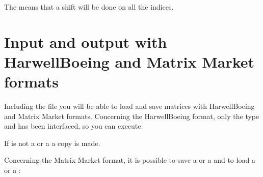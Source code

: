 \documentclass[a4paper,11pt,english]{sphinxmanual}
\begin{document}
\sphinxAtStartPar
The  means that a shift will be done on all the indices.


\chapter{Input and output with Harwell\sphinxhyphen{}Boeing and Matrix Market formats}
\label{\detokenize{gmm/export:input-and-output-with-harwell-boeing-and-matrix-market-formats}}\label{\detokenize{gmm/export:gmm-export}}\label{\detokenize{gmm/export::doc}}
\sphinxAtStartPar
Including the file  you will be able to load and save matrices with Harwell\sphinxhyphen{}Boeing and Matrix Market formats. Concerning the Harwell\sphinxhyphen{}Boeing format, only the type  and  has been interfaced, so you can execute:

\begin{sphinxVerbatim}[commandchars=\\\{\}]
  
  
\end{sphinxVerbatim}

\sphinxAtStartPar
If  is not a   or a  a copy is made.

\sphinxAtStartPar
Concerning the Matrix Market format, it is possible to save a  or a   and to load a  or a :

\begin{sphinxVerbatim}[commandchars=\\\{\}]
  
  
\end{sphinxVerbatim}
\end{document}
